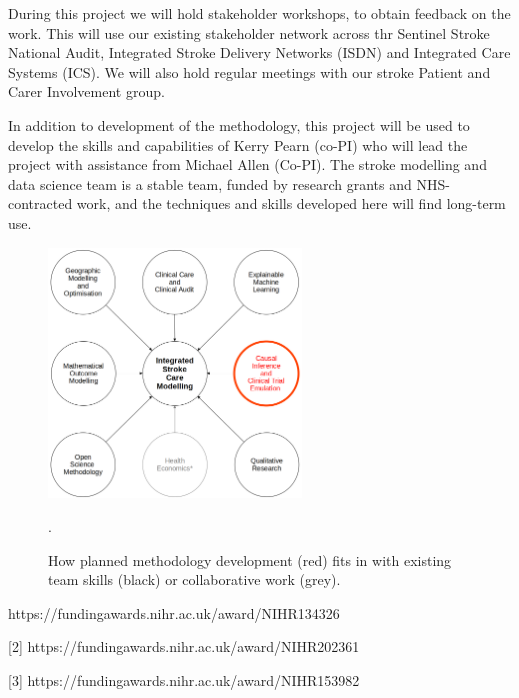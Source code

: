 \begin{markdown}
During this project we will hold stakeholder workshops, to obtain feedback on the work. This will use our existing stakeholder network across thr Sentinel Stroke National Audit, Integrated Stroke Delivery Networks (ISDN) and Integrated Care Systems (ICS). We will also hold regular meetings with our stroke Patient and Carer Involvement group.

In addition to development of the methodology, this project will be used to develop the skills and capabilities of Kerry Pearn (co-PI) who will lead the project with assistance from Michael Allen (Co-PI). The stroke modelling and data science team is a stable team, funded by research grants and NHS-contracted work, and the techniques and skills developed here will find long-term use.

\end{markdown}

\begin{figure}[h]
\centering
\includegraphics[width=0.6\textwidth]{./images/expertise}
\caption{How planned methodology development (red) fits in with existing team skills (black) or collaborative work (grey).}.
\label{fig:expertise}
\end{figure}

\begin{markdown}
[1] https://fundingawards.nihr.ac.uk/award/NIHR134326

[2] https://fundingawards.nihr.ac.uk/award/NIHR202361

[3] https://fundingawards.nihr.ac.uk/award/NIHR153982
\end{markdown}